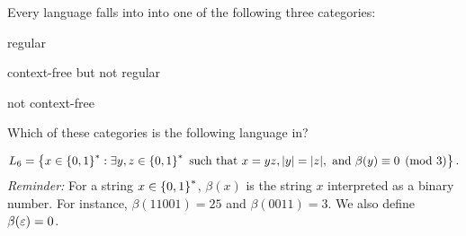 \begin{problem}
  Every language falls into into one of the following three categories:
  \begin{enumroman}
    \item regular
    \item context-free but not regular
    \item not context-free
  \end{enumroman}
  Which of these categories is the following language in?

  \[
    L_6 = \left\{ x \in \left\{0, 1\right\}^* : \exists y, z \in \left\{0, 1\right\}^*
    \text{ such that } x = yz, \lvert y\rvert = \lvert z\rvert,
    \text{ and $\beta(y) \equiv 0 \pmod 3 $}\right\}.
  \]
  \emph{Reminder:} For a string $x \in \left\{0, 1\right\}^*$, $\beta(x)$ is the
  string $x$ interpreted as a binary number.
  For instance, $\beta(11001) = 25$ and $\beta(0011) = 3$.
  We also define $\beta(\varepsilon) = 0$.
\end{problem}
